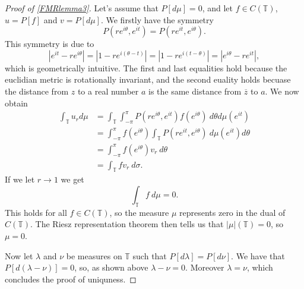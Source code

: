\documentclass[a4paper,12pt,twoside,BCOR=10mm]{scrbook}
\begin{document}
\begin{proof}[Proof of \ref{FMRlemma3}]
Let's assume that $P[d\mu] = 0$, and let $f \in C(\mathbb{T})$, $u = P[f]$ and $v = P[d\mu]$.
We firstly have the symmetry
\[
	P(re^{i\theta}, e^{it})
	=
	P(re^{it}, e^{i\theta}).
\]
This symmetry is due to
\[
	|e^{it} - re^{i\theta}|
	=
	|1 - re^{i(\theta - t)}|
	=
	|1 - re^{i(t - \theta)}|
	=
	|e^{i\theta} - re^{it}|,
\]
which is geometrically intuitive.
The first and last equalities hold because the euclidian metric is rotationally invariant, and the second euality holds becuase the distance from $z$ to a real number $a$ is the same distance from $\overline{z}$ to $a$.
We now obtain
\begin{align*}
\int_{\mathbb{T}} u_r d\mu
&= \int_{\mathbb{T}} \int_{-\pi}^{\pi} P(re^{i\theta}, e^{it}) f(e^{i\theta})\ d\theta d\mu(e^{it})\\
&= \int_{-\pi}^{\pi} f(e^{i\theta}) \int_{\mathbb{T}} P(re^{it}, e^{i\theta})\ d\mu(e^{it}) d\theta\\
&= \int_{-\pi}^{\pi} f(e^{i\theta}) v_r\ d\theta\\
&= \int_{\mathbb{T}} fv_r\ d\sigma.
\end{align*}
If we let $r \rightarrow 1$ we get
\[
	\int_{\mathbb{T}}f\ d\mu = 0.
\]
This holds for all $f \in C(\mathbb{T})$, so the measure $\mu$ represents zero in the dual of $C(\mathbb{T})$.
The Riesz representation theorem then tells us that $|\mu|(\mathbb{T}) = 0$, so $\mu = 0$.

Now let $\lambda$ and $\nu$ be measures on $\mathbb{T}$ such that $P[d\lambda] = P[d\nu]$.
We have that $P[d(\lambda - \nu)] = 0$, so, as shown above $\lambda - \nu = 0$.
Moreover $\lambda = \nu$, which concludes the proof of uniquness.
\end{proof}
\end{document}
